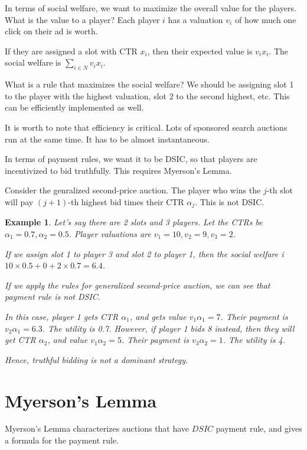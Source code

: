 \documentclass[twoside]{article}
\newtheorem{protoexample}[prototheorem]{Example}
\newenvironment{example}
{\colorlet{shadecolor}{red!15}\begin{shaded}\begin{protoexample}\normalfont}
		{\end{protoexample}\end{shaded}}
\begin{document}
In terms of social welfare, we want to maximize the overall value for the players. What is the value to a player? Each player $i$ has a valuation $v_i$ of how much one click on their ad is worth. 

If they are assigned a slot with CTR $x_i$, then their expected value is $v_ix_i$. The social welfare is $\sum_{i \in N} v_ix_i$. 

What is a rule that maximizes the social welfare? We should be assigning slot 1 to the player with the highest valuation, slot 2 to the second highest, etc. This can be efficiently implemented as well. 

It is worth to note that efficiency is critical. Lots of sponsored search auctions run at the same time. It has to be almost instantaneous. 

In terms of payment rules, we want it to be DSIC, so that players are incentivized to bid truthfully. This requires Myerson's Lemma. 

Consider the genralized second-price auction. The player who wins the $j$-th slot will pay $(j+1)$-th highest bid times their CTR $\alpha_j$. This is not DSIC. 

\begin{example}
	Let's say there are 2 slots and 3 players. Let the CTRs be $\alpha_1 = 0.7, \alpha_2 = 0.5$. Player valuations are $v_1 = 10, v_2 = 9, v_3 = 2$. 
		
	If we assign slot 1 to player 3 and slot 2 to player 1, then the social welfare i $10 \times 0.5 + 0 + 2 \times 0.7 = 6.4$. 
		
	If we apply the rules for generalized second-price auction, we can see that payment rule is not DSIC. 
		
	In this case, player 1 gets CTR $\alpha_1$, and gets value $v_1\alpha_1 = 7$. Their payment is $v_2\alpha_1 = 6.3$. The utility is 0.7. However, if player 1 bids 8 instead, then they will get CTR $\alpha_2$, and value $v_1\alpha_2 = 5$. Their payment is $v_3\alpha_2 = 1$. The utility is 4. 
		
	Hence, truthful bidding is not a dominant strategy. 
\end{example}

\section{Myerson's Lemma}
Myerson's Lemma characterizes auctions that have $DSIC$ payment rule, and gives a formula for the payment rule. 
\end{document}
